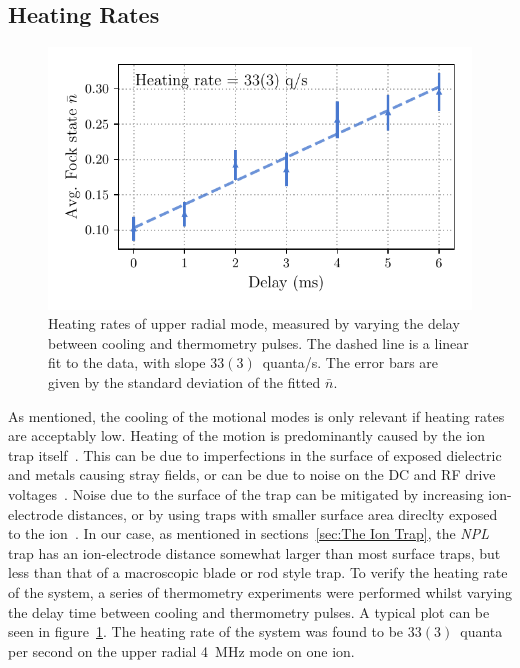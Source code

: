 \subsection{Heating Rates}
\label{sec:Heating}

    \begin{figure}
        \begin{center}
        \noindent\includegraphics[width=0.75\linewidth]{
            figures/pdf_figure/heating_rate.pdf
            }
        \end{center}
        \caption{
            Heating rates of upper radial mode, measured by varying the delay between cooling and thermometry pulses. The dashed line is a linear fit to the data, with slope $33(3)$~quanta/s. The error bars are given by the standard deviation of the fitted $\bar{n}$.
            }
        \label{fig:heating rates}
    \end{figure}

    As mentioned, the cooling of the motional modes is only relevant if heating rates are acceptably low. Heating of the motion is predominantly caused by the ion trap
    itself~\cite{}. This can be due to imperfections in the surface of exposed
    dielectric and metals causing stray fields, or can be due to noise on the DC
    and RF drive voltages~\cite{}. Noise due to the surface of the trap can be
    mitigated by increasing ion-electrode distances, or by using traps with
    smaller surface area direclty exposed to the ion~\cite{}. In our case, as mentioned
    in sections~\ref{sec:The Ion Trap}, the \emph{NPL} trap has an ion-electrode 
    distance somewhat larger than most surface traps, but less than that of a
    macroscopic blade or rod style trap. To verify the heating rate of the
    system, a series of thermometry experiments were performed whilst varying the delay
    time between cooling and thermometry pulses. A typical plot can be seen in
    figure~\ref{fig:heating rates}. The heating rate of the system
    was found to be $33(3)$~quanta per second on the upper radial 4~MHz mode on
    one ion.\\
    

